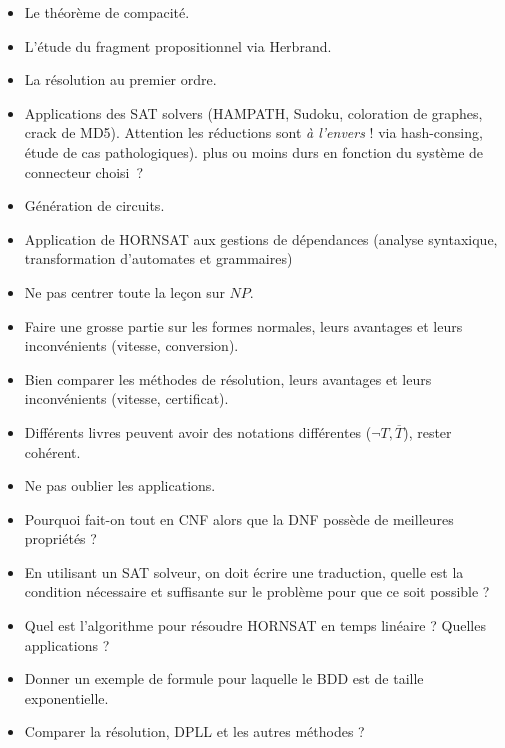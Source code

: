 \documentclass{agregfiche}
\begin{document}
\begin{itemize}
    \item Le théorème de compacité.
    \item L'étude du fragment propositionnel
        via Herbrand.
    \item La résolution au premier ordre.
    \item Applications des SAT solvers 
        (HAMPATH, Sudoku, coloration de graphes, crack de MD5). 
        Attention les réductions sont \emph{à l'envers} !
        via hash-consing,
        étude de cas pathologiques).
        plus ou moins durs en fonction du système de connecteur choisi~?
    \item Génération de circuits.
    \item Application de HORNSAT aux gestions de dépendances (analyse
        syntaxique, transformation d'automates et grammaires)
\end{itemize}

\secpieges

\begin{itemize}
    \item Ne pas centrer toute la leçon sur $NP$.
    \item Faire une grosse partie sur les formes normales, leurs avantages
        et leurs inconvénients (vitesse, conversion).
    \item Bien comparer les méthodes de résolution, leurs avantages et leurs
        inconvénients (vitesse, certificat).
        \item Différents livres peuvent avoir des notations 
        différentes ($\neg T, \overline{T}$), rester cohérent.
        \item Ne pas oublier les applications.
\end{itemize}


\secquestionsclassiques

\begin{itemize}
    \item Pourquoi fait-on tout en CNF alors que la DNF possède de meilleures 
        propriétés ?
    \item En utilisant un SAT solveur, on doit écrire une traduction, quelle
        est la condition nécessaire et suffisante sur le problème pour que ce soit
        possible ?
    \item Quel est l'algorithme pour résoudre HORNSAT en temps linéaire ?
        Quelles applications ?
    \item Donner un exemple de formule pour laquelle le BDD est de 
    taille
        exponentielle.
    \item Comparer la résolution, DPLL et les autres méthodes ?
\end{itemize}
\end{document}
